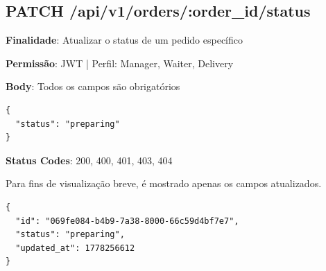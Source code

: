 \subsection{PATCH /api/v1/orders/:order\_id/status}

\noindent\textbf{Finalidade}: Atualizar o status de um pedido específico

\noindent\textbf{Permissão}: JWT | Perfil: Manager, Waiter, Delivery

\noindent\textbf{Body}: Todos os campos são obrigatórios

\begin{verbatim}
{
  "status": "preparing"
}
\end{verbatim}

\noindent\textbf{Status Codes}: 200, 400, 401, 403, 404

\begin{tcolorbox}[colback=green!5, colframe=black, title=\textbf{200 OK}]
Para fins de visualização breve, é mostrado apenas os campos atualizados.
\begin{verbatim}
{
  "id": "069fe084-b4b9-7a38-8000-66c59d4bf7e7",
  "status": "preparing",
  "updated_at": 1778256612
}
\end{verbatim}
\end{tcolorbox}
